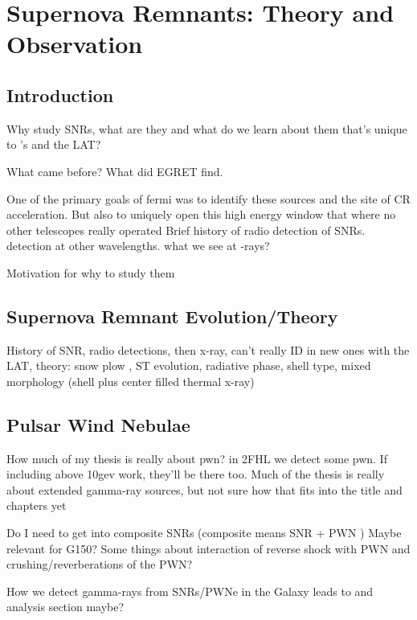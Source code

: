 \chapter{Supernova Remnants: Theory and  Observation}
\label{chap:Rems}

\section{Introduction}\label{Rems:intro}
Why study SNRs, what are they and what do we learn about them that's unique to \gam 's and the LAT?

What came before? What did EGRET find.

One of the primary goals of fermi was to identify these sources and the site of CR acceleration. But also to uniquely open this high energy window that where no other telescopes really operated
Brief history of radio detection of SNRs. detection at other wavelengths. what we see at \g-rays?

Motivation for why to study them
\citep{Sturner95}
\citep{Esposito96}
\section{Supernova Remnant Evolution/Theory}

History of SNR,  radio detections, then x-ray, can't really ID in new ones with the LAT, theory: snow plow , ST evolution, radiative phase, shell type, mixed morphology (shell plus center filled thermal x-ray) 
\section{Pulsar Wind Nebulae }

How much of my thesis is really about pwn? in 2FHL we detect some pwn. If including above 10gev work, they'll be there too. Much of the thesis is really about extended gamma-ray sources, but not sure how that fits into the title and chapters yet

Do I need to get into composite SNRs (composite means SNR + PWN ) Maybe relevant for G150? Some things about interaction of reverse shock with PWN and crushing/reverberations of the PWN?

How we detect gamma-rays from SNRs/PWNe in the Galaxy leads to and analysis section maybe?

